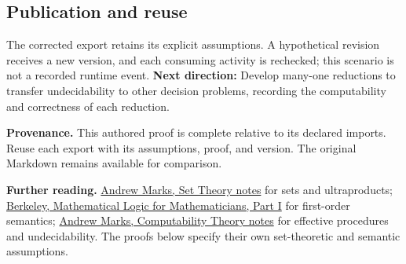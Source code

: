 \documentclass[preprint,12pt,aps,pra,showkeys,amsmath,amssymb,superscriptaddress,floatfix]{revtex4-2}
\theoremstyle{definition}
\theoremstyle{remark}
\begin{document}
\subsection{Publication and reuse}
The corrected export retains its explicit assumptions. A hypothetical
revision receives a new version, and each consuming activity is
rechecked; this scenario is not a recorded runtime event. \textbf{Next
direction:} Develop many-one reductions to transfer undecidability to
other decision problems, recording the computability and correctness of
each reduction.

\par\medskip\begingroup\small\linespread{1.0}\selectfont\noindent\textbf{Provenance.} This authored proof is complete relative to its declared imports. Reuse
each export with its assumptions, proof, and version. The original
Markdown remains available for comparison.
\par\endgroup

\par\smallskip\begingroup\small\linespread{1.0}\selectfont\noindent\textbf{Further reading.} \href{https://math.berkeley.edu/~marks/notes/set_theory_notes_4.pdf}{Andrew
Marks, Set Theory notes} for sets and ultraproducts;
\href{https://math.berkeley.edu/~antonio/math125A/mathlogicP1.pdf}{Berkeley,
Mathematical Logic for Mathematicians, Part I} for first-order
semantics;
\href{https://math.berkeley.edu/~marks/notes/computability_notes_v1.pdf}{Andrew
Marks, Computability Theory notes} for effective procedures and
undecidability. The proofs below specify their own set-theoretic and
semantic assumptions.\par\endgroup
\end{document}
